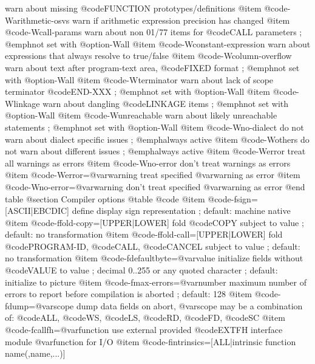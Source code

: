 warn about missing @code{FUNCTION} prototypes/definitions
@item @code{-Warithmetic-osvs}
warn if arithmetic expression precision has changed
@item @code{-Wcall-params}
warn about non 01/77 items for @code{CALL} parameters
; @emph{not set with @option{-Wall}}
@item @code{-Wconstant-expression}
warn about expressions that always resolve to true/false
@item @code{-Wcolumn-overflow}
warn about text after program-text area, @code{FIXED} format
; @emph{not set with @option{-Wall}}
@item @code{-Wterminator}
warn about lack of scope terminator @code{END-XXX}
; @emph{not set with @option{-Wall}}
@item @code{-Wlinkage}
warn about dangling @code{LINKAGE} items
; @emph{not set with @option{-Wall}}
@item @code{-Wunreachable}
warn about likely unreachable statements
; @emph{not set with @option{-Wall}}
@item @code{-Wno-dialect}
do not warn about dialect specific issues
; @emph{always active}
@item @code{-Wothers}
do not warn about different issues
; @emph{always active}
@item @code{-Werror}
treat all warnings as errors
@item @code{-Wno-error}
don't treat warnings as errors
@item @code{-Werror=@var{warning}}
treat specified @var{warning} as error
@item @code{-Wno-error=@var{warning}}
don't treat specified @var{warning} as error
@end table
@section Compiler options
@table @code
@item @code{-fsign=[ASCII|EBCDIC]}
define display sign representation
; default: machine native
@item @code{-ffold-copy=[UPPER|LOWER]}
fold @code{COPY} subject to value
; default: no transformation
@item @code{-ffold-call=[UPPER|LOWER]}
fold @code{PROGRAM-ID}, @code{CALL}, @code{CANCEL} subject to value
; default: no transformation
@item @code{-fdefaultbyte=@var{value}}
initialize fields without @code{VALUE} to value
; decimal 0..255 or any quoted character
; default: initialize to picture
@item @code{-fmax-errors=@var{number}}
maximum number of errors to report before
compilation is aborted
; default: 128
@item @code{-fdump=@var{scope}}
dump data fields on abort, @var{scope} may be
a combination of: @code{ALL}, @code{WS}, @code{LS}, @code{RD}, @code{FD}, @code{SC}
@item @code{-fcallfh=@var{function}}
use external provided @code{EXTFH} interface module
@var{function} for I/O
@item @code{-fintrinsics=[ALL|intrinsic function name(,name,...)]}

